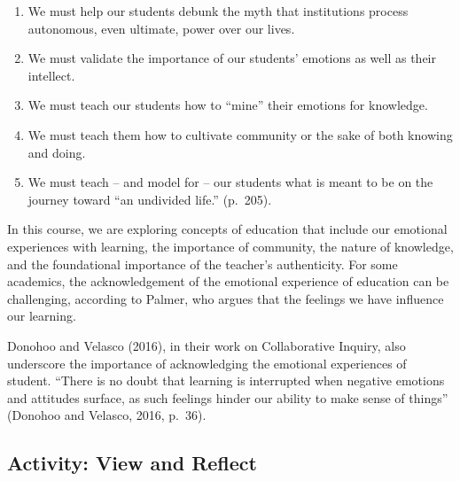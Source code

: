 \documentclass[
]{book}
\providecommand{\tightlist}{%
  \setlength{\itemsep}{0pt}\setlength{\parskip}{0pt}}
\begin{document}
\begin{enumerate}
\def\labelenumi{\arabic{enumi}.}
\tightlist
\item
  We must help our students debunk the myth that institutions process autonomous, even ultimate, power over our lives.\\
\item
  We must validate the importance of our students' emotions as well as their intellect.\\
\item
  We must teach our students how to ``mine'' their emotions for knowledge.\\
\item
  We must teach them how to cultivate community or the sake of both knowing and doing.\\
\item
  We must teach -- and model for -- our students what is meant to be on the journey toward ``an undivided life.'' (p.~205).
\end{enumerate}

In this course, we are exploring concepts of education that include our emotional experiences with learning, the importance of community, the nature of knowledge, and the foundational importance of the teacher's authenticity. For some academics, the acknowledgement of the emotional experience of education can be challenging, according to Palmer, who argues that the feelings we have influence our learning.

Donohoo and Velasco (2016), in their work on Collaborative Inquiry, also underscore the importance of acknowledging the emotional experiences of student. ``There is no doubt that learning is interrupted when negative emotions and attitudes surface, as such feelings hinder our ability to make sense of things'' (Donohoo and Velasco, 2016, p.~36).

\hypertarget{activity-view-and-reflect-1}{%
\subsection*{Activity: View and Reflect}\label{activity-view-and-reflect-1}}
\end{document}
